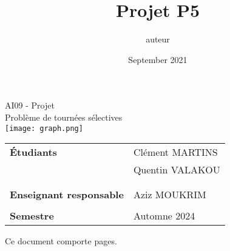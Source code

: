 \documentclass[a4paper, 12pt, DIV=12]{scrartcl}
\title{Projet P5}
\author{auteur}
\date{September 2021}
\begin{document}
\begin{titlepage}
\thispagestyle{empty}



   \begin{center}
    \vspace{0.5cm}
    \Huge
   AI09 - Projet\\
   \Large
   Problème de tournées sélectives\\[30pt]
 \texttt{[image: graph.png]}\\

   \vspace{1cm}
   \vspace{1cm}
   \vspace{1cm}
   \normalsize
   \begin{tabularx}{\textwidth} { %
   >{\raggedright\arraybackslash}X 
   >{\raggedright\arraybackslash}X  }
        \textbf{Étudiants} &
Clément MARTINS\\
&Quentin VALAKOU\\

\\
        & \\
        \textbf{Enseignant responsable} & Aziz MOUKRIM\\
      
        & \\
        \textbf{Semestre} &  Automne 2024 \\[30pt]
    \end{tabularx}
   \end{center}
\begin{center}
Ce document comporte \pageref{LastPage} pages. 
\end{center}
\end{titlepage}


\renewcommand{\thesection}{\Roman{section}}

\end{document}
